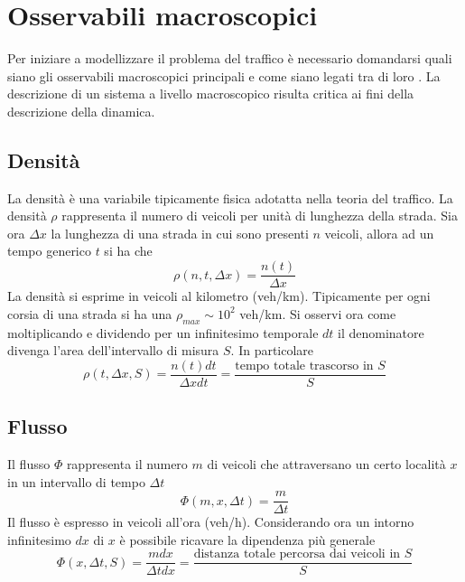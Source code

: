 \section{Osservabili macroscopici}
Per iniziare a modellizzare il problema del traffico \`e necessario domandarsi quali siano gli osservabili macroscopici principali e come siano legati tra di loro \cite{H111}.
La descrizione di un sistema a livello macroscopico risulta critica ai fini della descrizione della dinamica.
\subsection{Densit\`a}
La densit\`a \`e una variabile tipicamente fisica adotatta nella teoria del traffico.
La densit\`a $\rho$ rappresenta il numero di veicoli per unit\`a di lunghezza della strada.
Sia ora $\Delta x$ la lunghezza di una strada in cui sono presenti $n$ veicoli, allora ad un tempo generico $t$ si ha che
\begin{equation*}
    \rho(n,t,\Delta x)=\frac{n(t)}{\Delta x}
\end{equation*}
La densit\`a si esprime in veicoli al kilometro (veh/km).
Tipicamente per ogni corsia di una strada si ha una $\rho_{max}\sim 10^2$ veh/km.
Si osservi ora come moltiplicando e dividendo per un infinitesimo temporale $dt$ il denominatore divenga l'area dell'intervallo di misura $S$.
In particolare
\begin{equation}
    \rho(t,\Delta x, S)=\frac{n(t)dt}{\Delta x dt}=\frac{\mbox{tempo totale trascorso in }S}{S}
    \label{eq:rho_s}
\end{equation}

\subsection{Flusso}
Il flusso $\Phi$ rappresenta il numero $m$ di veicoli che attraversano un certo localit\`a $x$ in un intervallo di tempo $\Delta t$
\begin{equation}
    \Phi(m, x, \Delta t)=\frac{m}{\Delta t}
\end{equation}
Il flusso \`e espresso in veicoli all'ora (veh/h).
Considerando ora un intorno infinitesimo $dx$ di $x$ \`e possibile ricavare la dipendenza più generale
\begin{equation}
    \Phi(x, \Delta t, S)=\frac{mdx}{\Delta t dx}=\frac{\mbox{distanza totale percorsa dai veicoli in }S}{S}
    \label{eq:phi_s}
\end{equation}

